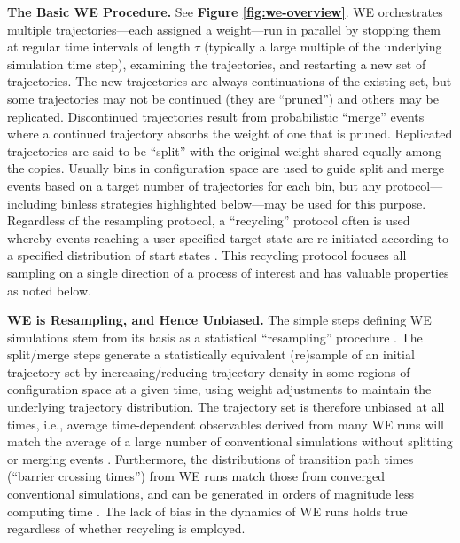 \textbf{The Basic WE Procedure.} See \textbf{Figure \ref{fig:we-overview}}. 
WE orchestrates multiple trajectories---each assigned a weight---run in parallel by stopping them at regular time intervals of length $\tau$ (typically a large multiple of the underlying simulation time step), examining the trajectories, and restarting a new set of trajectories. 
The new trajectories are always continuations of the existing set, but some trajectories may not be continued (they are “pruned”) and others may be replicated. 
Discontinued trajectories result from probabilistic “merge” events where a continued trajectory absorbs the weight of one that is pruned. 
Replicated trajectories are said to be “split” with the original weight shared equally among the copies. 
Usually bins in configuration space are used to guide split and merge events based on a target number of trajectories for each bin, but any protocol---including binless strategies highlighted below---may be used for this purpose.
Regardless of the resampling protocol, a “recycling” protocol often is used whereby events reaching a user-specified target state are re-initiated according to a specified distribution of start states \citep{bhatt_steady-state_2010}.
This recycling protocol focuses all sampling on a single direction of a process of interest and has valuable properties as noted below.

\textbf{WE is Resampling, and Hence Unbiased.} The simple steps defining WE simulations stem from its basis as a statistical “resampling” procedure \citep{zhang_exact_2010}. 
The split/merge steps generate a statistically equivalent (re)sample of an initial trajectory set by increasing/reducing trajectory density in some regions of configuration space at a given time, using weight adjustments to maintain the underlying trajectory distribution. 
The trajectory set is therefore unbiased at all times, i.e., average time-dependent observables derived from many WE runs will match the average of a large number of conventional simulations without splitting or merging events \citep{zhang_exact_2010}. 
Furthermore, the distributions of transition path times (“barrier crossing times”) from WE runs match those from converged conventional simulations, and can be generated in orders of magnitude less computing time \citep{zwier_efficient_2011, zheng_simulating_2007}. 
The lack of bias in the dynamics of WE runs holds true regardless of whether recycling is employed.

